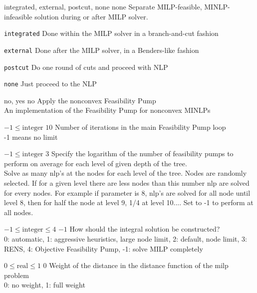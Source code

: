 %
{\ttfamily integrated, external, postcut, none}%
{none}%
{Separate MILP-feasible, MINLP-infeasible solution during or after MILP solver.}%
{\begin{list}{}{
\setlength{\parsep}{0em}
\setlength{\leftmargin}{5ex}
\setlength{\labelwidth}{2ex}
\setlength{\itemindent}{0ex}
\setlength{\topsep}{0pt}}
\item[\texttt{integrated}] Done within the MILP solver in a branch-and-cut fashion
\item[\texttt{external}] Done after the MILP solver, in a Benders-like fashion
\item[\texttt{postcut}] Do one round of cuts and proceed with NLP
\item[\texttt{none}] Just proceed to the NLP
\end{list}
}

%
{\ttfamily no, yes}%
{no}%
{Apply the nonconvex Feasibility Pump\\
An implementation of the Feasibility Pump for nonconvex MINLPs}%
{}

%
{$-1\leq\textrm{integer}$}%
{$10$}%
{Number of iterations in the main Feasibility Pump loop\\
-1 means no limit}%
{}

%
{$-1\leq\textrm{integer}$}%
{$3$}%
{Specify the logarithm of the number of feasibility pumps to perform on average for each level of given depth of the tree.\\
Solve as many nlp's at the nodes for each level of the tree. Nodes are randomly selected. If for a given level there are less nodes than this number nlp are solved for every nodes. For example if parameter is 8, nlp's are solved for all node until level 8, then for half the node at level 9, 1/4 at level 10.... Set to -1 to perform at all nodes.}%
{}

%
{$-1\leq\textrm{integer}\leq4$}%
{$-1$}%
{How should the integral solution be constructed?\\
0: automatic, 1: aggressive heuristics, large node limit, 2: default, node limit, 3: RENS, 4: Objective Feasibility Pump,  -1: solve MILP completely}%
{}

%
{$0\leq\textrm{real}\leq1$}%
{$0$}%
{Weight of the distance in the distance function of the milp problem\\
0: no weight, 1: full weight}%
{}

